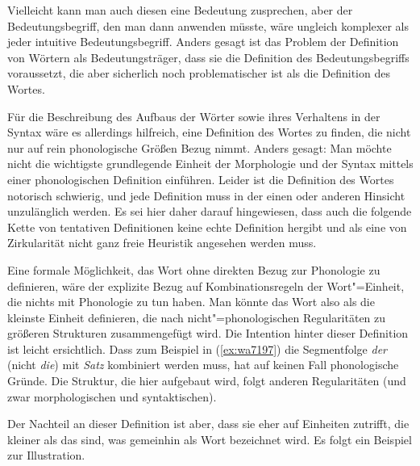 \begin{exe}
\end{exe}

Vielleicht kann man auch diesen eine Bedeutung zusprechen, aber der Bedeutungsbegriff, den man dann anwenden müsste, wäre ungleich komplexer als jeder intuitive Bedeutungsbegriff.
Anders gesagt ist das Problem der Definition von Wörtern als Bedeutungsträger, dass sie die Definition des Bedeutungsbegriffs voraussetzt, die aber sicherlich noch problematischer ist als die Definition des Wortes.

Für die Beschreibung des Aufbaus der Wörter sowie ihres Verhaltens in der Syntax wäre es allerdings hilfreich, eine Definition des Wortes zu finden, die nicht nur auf rein phonologische Größen Bezug nimmt.
Anders gesagt:
Man möchte nicht die wichtigste grundlegende Einheit der Morphologie und der Syntax mittels einer phonologischen Definition einführen.
Leider ist die Definition des Wortes notorisch schwierig, und jede Definition muss in der einen oder anderen Hinsicht unzulänglich werden.
Es sei hier daher darauf hingewiesen, dass auch die folgende Kette von tentativen Definitionen keine echte Definition hergibt und als eine von Zirkularität nicht ganz freie Heuristik angesehen werden muss.

Eine formale Möglichkeit, das Wort ohne direkten Bezug zur Phonologie zu definieren, wäre der explizite Bezug auf Kombinationsregeln der Wort"=Einheit, die nichts mit Phonologie zu tun haben.
Man könnte das Wort also als die kleinste Einheit definieren, die nach nicht"=phonologischen Regularitäten zu größeren Strukturen zusammengefügt wird.
Die Intention hinter dieser Definition ist leicht ersichtlich.
Dass zum Beispiel in (\ref{ex:wa7197}) die Segmentfolge \textit{der} (nicht \textit{die}) mit \textit{Satz} kombiniert werden muss, hat auf keinen Fall phonologische Gründe.
Die Struktur, die hier aufgebaut wird, folgt anderen Regularitäten (und zwar morphologischen und syntaktischen).

\begin{exe}
  \ex\label{ex:wa7197}
  \begin{xlist}
  \end{xlist}
\end{exe}

Der Nachteil an dieser Definition ist aber, dass sie eher auf Einheiten zutrifft, die kleiner als das sind, was gemeinhin als Wort bezeichnet wird.
Es folgt ein Beispiel zur Illustration.

